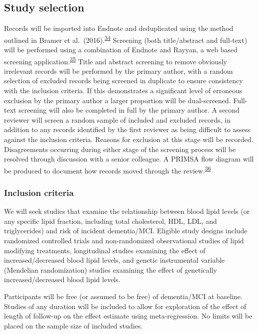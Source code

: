 \documentclass[a4paper, twoside]{templates/ociamthesis}
\begin{document}
\hypertarget{study-selection}{%
\subsection{Study selection}\label{study-selection}}

Records will be imported into Endnote and deduplicated using the method outlined in Bramer et al.~(2016).\textsuperscript{\protect\hyperlink{ref-bramer2016}{34}} Screening (both title/abstract and full-text) will be performed using a combination of Endnote and Rayyan, a web based screening application.\textsuperscript{\protect\hyperlink{ref-ouzzani2016}{35}} Title and abstract screening to remove obviously irrelevant records will be performed by the primary author, with a random selection of excluded records being screened in duplicate to ensure consistency with the inclusion criteria. If this demonstrates a significant level of erroneous exclusion by the primary author a larger proportion will be dual-screened. Full-text screening will also be completed in full by the primary author. A second reviewer will screen a random sample of included and excluded records, in addition to any records identified by the first reviewer as being difficult to assess against the inclusion criteria. Reasons for exclusion at this stage will be recorded. Disagreements occurring during either stage of the screening process will be resolved through discussion with a senior colleague. A PRIMSA flow diagram will be produced to document how records moved through the review.\textsuperscript{\protect\hyperlink{ref-zotero-766}{36}}

\hypertarget{inclusion-criteria}{%
\subsubsection{Inclusion criteria}\label{inclusion-criteria}}

We will seek studies that examine the relationship between blood lipid levels (or any specific lipid fraction, including total cholesterol, HDL, LDL, and triglycerides) and risk of incident dementia/MCI. Eligible study designs include randomized controlled trials and non-randomized observational studies of lipid modifying treatments, longitudinal studies examining the effect of increased/decreased blood lipid levels, and genetic instrumental variable (Mendelian randomization) studies examining the effect of genetically increased/decreased blood lipid levels.

Participants will be free (or assumed to be free) of dementia/MCI at baseline. Studies of any duration will be included to allow for exploration of the effect of length of follow-up on the effect estimate using meta-regression. No limits will be placed on the sample size of included studies.
\end{document}
